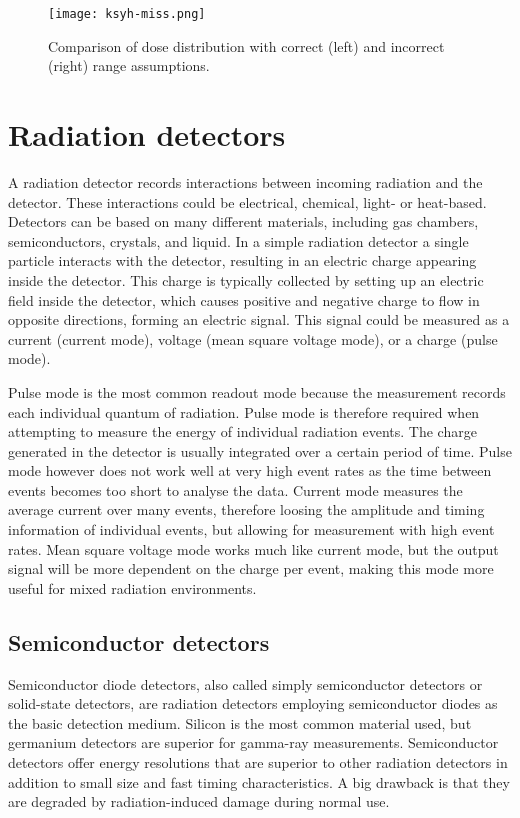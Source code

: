 \documentclass[../main/thesis.tex]{subfiles}
\begin{document}
\begin{figure}%
	\centering
	\texttt{[image: ksyh-miss.png]}
	\caption{Comparison of dose distribution with correct (left) and incorrect (right) range assumptions. \citep{ksyh-phys251}}
	\label{fig-miss}
\end{figure}

\section{Radiation detectors}
\label{t-detector}
A radiation detector records interactions between incoming radiation and the detector. These interactions could be electrical, chemical, light- or heat-based. Detectors can be based on many different materials, including gas chambers, semiconductors, crystals, and liquid. In a simple radiation detector a single particle interacts with the detector, resulting in an electric charge appearing inside the detector. This charge is typically collected by setting up an electric field inside the detector, which causes positive and negative charge to flow in opposite directions, forming an electric signal. This signal could be measured as a current (current mode), voltage (mean square voltage mode), or a charge (pulse mode). \citep[chap. 4]{Knoll}

Pulse mode is the most common readout mode because the measurement records each individual quantum of radiation. Pulse mode is therefore required when attempting to measure the energy of individual radiation events. The charge generated in the detector is usually integrated over a certain period of time. Pulse mode however does not work well at very high event rates as the time between events becomes too short to analyse the data. Current mode measures the average current over many events, therefore loosing the amplitude and timing information of individual events, but allowing for measurement with high event rates. Mean square voltage mode works much like current mode, but the output signal will be more dependent on the charge per event, making this mode more useful for mixed radiation environments. \citep[chap. 4]{Knoll}




\subsection{Semiconductor detectors}
\label{t-semi}
Semiconductor diode detectors, also called simply semiconductor detectors or solid-state detectors, are radiation detectors employing semiconductor diodes as the basic detection medium. Silicon is the most common material used, but germanium detectors are superior for gamma-ray measurements. Semiconductor detectors offer energy resolutions that are superior to other radiation detectors in addition to small size and fast timing characteristics. A big drawback is that they are degraded by radiation-induced damage during normal use. \citep[chap. 11]{Knoll}
\end{document}
